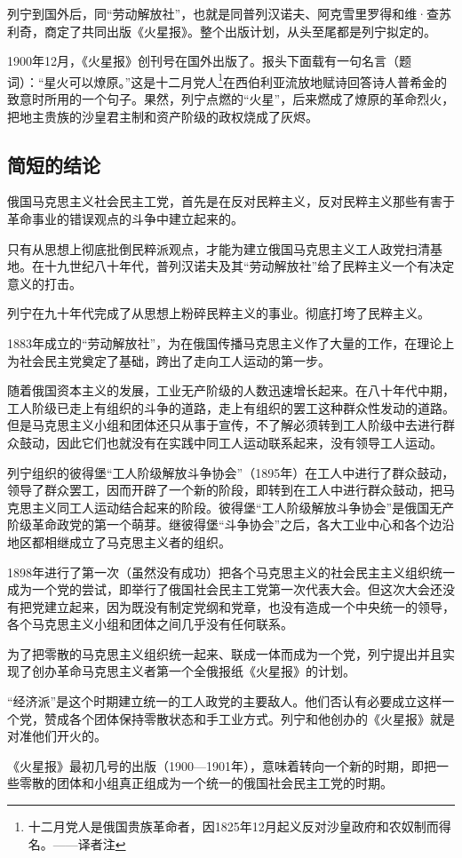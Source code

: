 列宁到国外后，同“劳动解放社”，也就是同普列汉诺夫、阿克雪里罗得和维·查苏利奇，商定了共同出版《火星报》。整个出版计划，从头至尾都是列宁拟定的。

1900年12月，《火星报》创刊号在国外出版了。报头下面载有一句名言（题词）：“星火可以燎原。”这是十二月党人\footnote{十二月党人是俄国贵族革命者，因1825年12月起义反对沙皇政府和农奴制而得名。——译者注}在西伯利亚流放地赋诗回答诗人普希金的致意时所用的一个句子。果然，列宁点燃的“火星”，后来燃成了燎原的革命烈火，把地主贵族的沙皇君主制和资产阶级的政权烧成了灰烬。

\subsection{简短的结论}

俄国马克思主义社会民主工党，首先是在反对民粹主义，反对民粹主义那些有害于革命事业的错误观点的斗争中建立起来的。

只有从思想上彻底批倒民粹派观点，才能为建立俄国马克思主义工人政党扫清基地。在十九世纪八十年代，普列汉诺夫及其“劳动解放社”给了民粹主义一个有决定意义的打击。

列宁在九十年代完成了从思想上粉碎民粹主义的事业。彻底打垮了民粹主义。

1883年成立的“劳动解放社”，为在俄国传播马克思主义作了大量的工作，在理论上为社会民主党奠定了基础，跨出了走向工人运动的第一步。

随着俄国资本主义的发展，工业无产阶级的人数迅速增长起来。在八十年代中期，工人阶级已走上有组织的斗争的道路，走上有组织的罢工这种群众性发动的道路。但是马克思主义小组和团体还只从事于宣传，不了解必须转到工人阶级中去进行群众鼓动，因此它们也就没有在实践中同工人运动联系起来，没有领导工人运动。

列宁组织的彼得堡“工人阶级解放斗争协会”（1895年）在工人中进行了群众鼓动，领导了群众罢工，因而开辟了一个新的阶段，即转到在工人中进行群众鼓动，把马克思主义同工人运动结合起来的阶段。彼得堡“工人阶级解放斗争协会”是俄国无产阶级革命政党的第一个萌芽。继彼得堡“斗争协会”之后，各大工业中心和各个边沿地区都相继成立了马克思主义者的组织。

1898年进行了第一次（虽然没有成功）把各个马克思主义的社会民主主义组织统一成为一个党的尝试，即举行了俄国社会民主工党第一次代表大会。但这次大会还没有把党建立起来，因为既没有制定党纲和党章，也没有造成一个中央统一的领导，各个马克思主义小组和团体之间几乎没有任何联系。

为了把零散的马克思主义组织统一起来、联成一体而成为一个党，列宁提出并且实现了创办革命马克思主义者第一个全俄报纸《火星报》的计划。

“经济派”是这个时期建立统一的工人政党的主要敌人。他们否认有必要成立这样一个党，赞成各个团体保持零散状态和手工业方式。列宁和他创办的《火星报》就是对准他们开火的。

《火星报》最初几号的出版（1900—1901年），意味着转向一个新的时期，即把一些零散的团体和小组真正组成为一个统一的俄国社会民主工党的时期。

